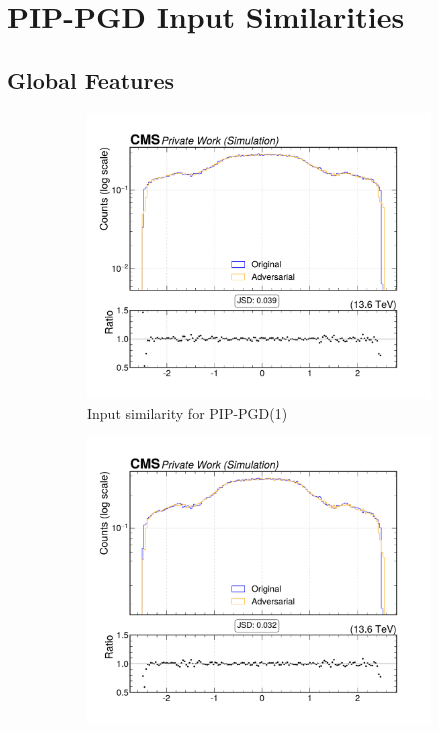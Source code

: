 \section{PIP-PGD Input Similarities}
\label{appendix:combined}

\subsection*{Global Features}


\begin{figure}[htbp]
  \centering
  \begin{subfigure}[t]{0.32\textwidth}
    \includegraphics[width=\linewidth]{media/output/features/compare/combined_it_1/cmp_global_features_jet_eta.pdf}
    \caption*{Input similarity for PIP-PGD(1)}
  \end{subfigure}\hfill
  \begin{subfigure}[t]{0.32\textwidth}
    \includegraphics[width=\linewidth]{media/output/features/compare/combined_it_2/cmp_global_features_jet_eta.pdf}

\end{subfigure}
\end{figure}
